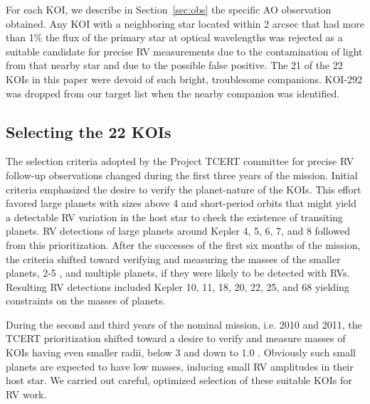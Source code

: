 \documentclass{emulateapj}
\begin{document}
For each KOI, we describe in Section~\ref{sec:obs} the specific AO
observation obtained.  Any KOI with a neighboring star located within
2 arcsec that had more than 1\% the flux of the primary star at
optical wavelengths was rejected as a suitable candidate for precise
RV measurements due to the contamination of light from that nearby
star and due to the possible false positive.  The 21 of the 22 KOIs in this
paper were devoid of such bright, troublesome companions. KOI-292
was dropped from our target list when the nearby companion
was identified.


\subsection{Selecting the 22 KOIs}
\label{sec:choose22}

The selection criteria adopted by the \ek Project TCERT committee for
precise RV follow-up observations changed during the first three years
of the mission.  Initial criteria emphasized the desire to verify the
planet-nature of the KOIs. This effort favored large planets with
sizes above 4 \rearth and short-period orbits that might yield a
detectable RV variation in the host star to check the existence of \ek
transiting planets.  RV detections of large planets around Kepler 4,
5, 6, 7, and 8 followed from this prioritization. After the successes
of the first six months of the \ek mission, the criteria shifted
toward verifying and measuring the masses of the smaller planets, 2-5
\rearth, and multiple planets, if they were likely to be detected with
RVs.  Resulting RV detections included Kepler 10, 11, 18, 20, 22, 25,
and 68 yielding constraints on the masses of planets.

During the second and third years of the nominal \ek mission,
i.e. 2010 and 2011, the TCERT prioritization shifted toward a desire
to verify and measure masses of KOIs having even smaller radii, below
3 \rearth and down to 1.0 \rearth. Obviously such small planets are
expected to have low masses, inducing small RV amplitudes in their
host star.  We carried out careful, optimized selection of these
suitable KOIs for RV work.
\end{document}
